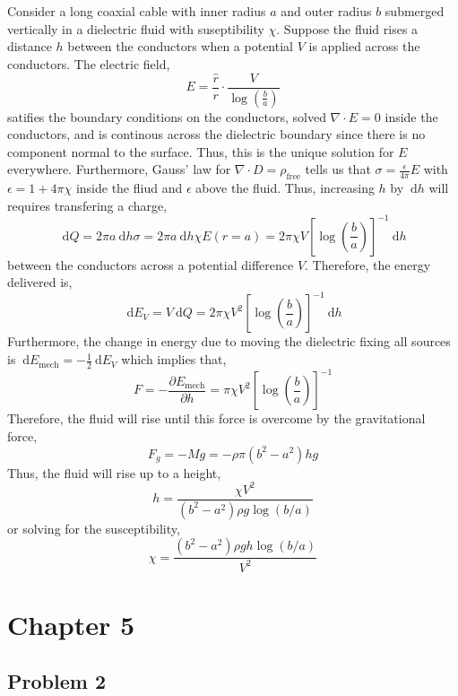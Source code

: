 \documentclass[12pt]{extarticle}
\renewcommand{\d}[1]{\: \mathrm{d}#1}
\newcommand{\pderiv}[2]{\frac{\partial{#1}}{\partial{#2}}}
\theoremstyle{definition}
\begin{document}
Consider a long coaxial cable with inner radius $a$ and outer radius $b$ submerged vertically in a dielectric fluid with suseptibility $\chi$. Suppose the fluid rises a distance $h$ between the conductors when a potential $V$ is applied across the conductors. The electric field,
\[ E = \frac{\hat{r}}{r} \cdot \frac{V}{\log{\left( \frac{b}{a} \right)}} \]
satifies the boundary conditions on the conductors, solved $\nabla \cdot E = 0$ inside the conductors, and is continous across the dielectric boundary since there is no component normal to the surface. Thus, this is the unique solution for $E$ everywhere. Furthermore, Gauss' law for $\nabla \cdot D = \rho_{\text{free}}$ tells us that $\sigma = \frac{\epsilon}{4 \pi} E$ with $\epsilon = 1 + 4 \pi \chi$ inside the fliud and $\epsilon$ above the fluid. Thus, increasing $h$ by $\d{h}$ will requires transfering a charge,
\[ \d{Q} = 2 \pi a \d{h} \sigma = 2 \pi a \d{h} \chi E(r = a) = 2 \pi \chi V \left[ \log{\left( \frac{b}{a} \right)} \right]^{-1} \d{h} \]
between the conductors across a potential difference $V$. Therefore, the energy delivered is,
\[ \d{E_V} = V \d{Q} = 2 \pi \chi V^2 \left[ \log{\left( \frac{b}{a} \right)} \right]^{-1} \d{h} \]
Furthermore, the change in energy due to moving the dielectric fixing all sources is $\d{E_{\text{mech}}} = - \frac{1}{2} \d{E_{V}}$ which implies that,
\[ F = -\pderiv{E_{\text{mech}}}{h} = \pi \chi V^2 \left[ \log{\left( \frac{b}{a} \right)} \right]^{-1} \]
Therefore, the fluid will rise until this force is overcome by the gravitational force,
\[ F_g = - M g = - \rho \pi (b^2 - a^2) h g \]
Thus, the fluid will rise up to a height,
\[ h = \frac{\chi V^2}{(b^2 - a^2) \rho g \log{(b/a)}} \]
or solving for the susceptibility,
\[ \chi = \frac{(b^2 - a^2) \rho g h \log{(b / a)} }{V^2} \]
\section{Chapter 5}

\subsection{Problem 2}
\end{document}
